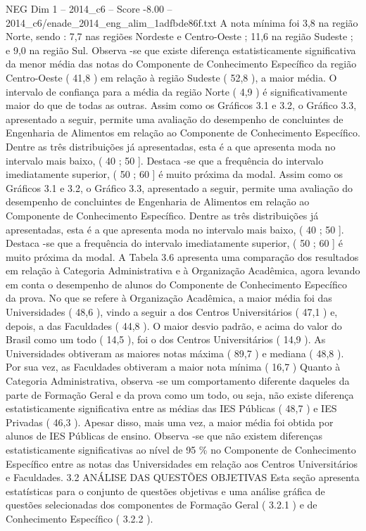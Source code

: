 \begin{textsample}{NEG Dim 1 – 2014\_c6 – Score -8.00 – 2014\_c6/enade\_2014\_eng\_alim\_1adfbde86f.txt}
A nota mínima foi 3,8 na região Norte, sendo : 7,7 nas regiões Nordeste e Centro-Oeste ; 11,6 na região Sudeste ; e 9,0 na região Sul.
Observa -se que existe diferença estatisticamente significativa da menor média das notas do Componente de Conhecimento Específico da região Centro-Oeste ( 41,8 ) em relação à região Sudeste ( 52,8 ), a maior média.
O intervalo de confiança para a média da região Norte ( 4,9 ) é significativamente maior do que de todas as outras.
Assim como os Gráficos 3.1 e 3.2, o Gráfico 3.3, apresentado a seguir, permite uma avaliação do desempenho de concluintes de Engenharia de Alimentos em relação ao Componente de Conhecimento Específico.
Dentre as três distribuições já apresentadas, esta é a que apresenta moda no intervalo mais baixo, ( 40 ; 50 ].
Destaca -se que a frequência do intervalo imediatamente superior, ( 50 ; 60 ] é muito próxima da modal.
Assim como os Gráficos 3.1 e 3.2, o Gráfico 3.3, apresentado a seguir, permite uma avaliação do desempenho de concluintes de Engenharia de Alimentos em relação ao Componente de Conhecimento Específico.
Dentre as três distribuições já apresentadas, esta é a que apresenta moda no intervalo mais baixo, ( 40 ; 50 ].
Destaca -se que a frequência do intervalo imediatamente superior, ( 50 ; 60 ] é muito próxima da modal.
A Tabela 3.6 apresenta uma comparação dos resultados em relação à Categoria Administrativa e à Organização Acadêmica, agora levando em conta o desempenho de alunos do Componente de Conhecimento Específico da prova.
No que se refere à Organização Acadêmica, a maior média foi das Universidades ( 48,6 ), vindo a seguir a dos Centros Universitários ( 47,1 ) e, depois, a das Faculdades ( 44,8 ).
O maior desvio padrão, e acima do valor do Brasil como um todo ( 14,5 ), foi o dos Centros Universitários ( 14,9 ).
As Universidades obtiveram as maiores notas máxima ( 89,7 ) e mediana ( 48,8 ).
Por sua vez, as Faculdades obtiveram a maior nota mínima ( 16,7 ) Quanto à Categoria Administrativa, observa -se um comportamento diferente daqueles da parte de Formação Geral e da prova como um todo, ou seja, não existe diferença estatisticamente significativa entre as médias das IES Públicas ( 48,7 ) e IES Privadas ( 46,3 ).
Apesar disso, mais uma vez, a maior média foi obtida por alunos de IES Públicas de ensino.
Observa -se que não existem diferenças estatisticamente significativas ao nível de 95 \% no Componente de Conhecimento Específico entre as notas das Universidades em relação aos Centros Universitários e Faculdades. 3.2 ANÁLISE DAS QUESTÕES OBJETIVAS Esta seção apresenta estatísticas para o conjunto de questões objetivas e uma análise gráfica de questões selecionadas dos componentes de Formação Geral ( 3.2.1 ) e de Conhecimento Específico ( 3.2.2 ).

\end{textsample}
